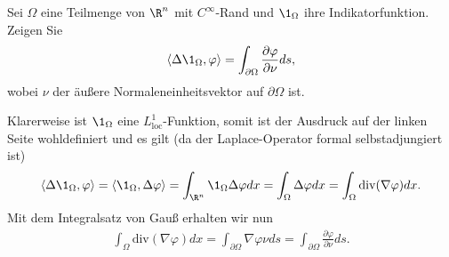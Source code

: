 
\begin{exercise}

Sei $\Omega$ eine Teilmenge von $\R^n$ mit $C^{\infty}$-Rand und $\1_\Omega$ ihre
Indikatorfunktion. Zeigen Sie
\begin{align*}
  \langle \Delta \1_\Omega, \varphi \rangle
  = \int_{\partial\Omega} \frac{\partial \varphi}{\partial \nu} ds,
\end{align*}
wobei $\nu$ der äußere Normaleneinheitsvektor auf $\partial\Omega$ ist.

\end{exercise}


\begin{solution}

Klarerweise ist $\1_\Omega$ eine $L^1_{\mathrm{loc}}$-Funktion, somit ist der Ausdruck
auf der linken Seite wohldefiniert und es gilt (da der Laplace-Operator formal selbstadjungiert ist)
\begin{align*}
  \langle \Delta \1_\Omega, \varphi \rangle
  = \langle  \1_\Omega, \Delta \varphi \rangle
  = \int_{\R^n}\1_\Omega \Delta \varphi dx
  = \int_{\Omega} \Delta \varphi dx
  = \int_{\Omega} \mathrm{div} (\nabla \varphi) dx.
\end{align*}
Mit dem Integralsatz von Gauß erhalten wir nun
\begin{align*}
  \int_{\Omega} \mathrm{div} (\nabla \varphi) dx
  = \int_{\partial\Omega} \nabla \varphi \nu ds
  = \int_{\partial\Omega} \frac{\partial \varphi}{\partial \nu} ds.
\end{align*}
\end{solution}

